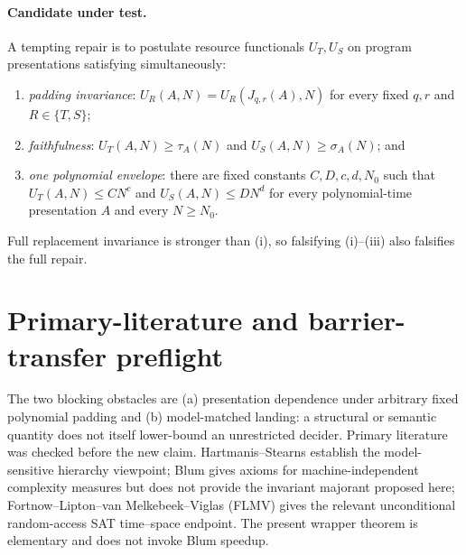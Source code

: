 \documentclass[11pt]{article}
\begin{document}
\paragraph{Candidate under test.}
A tempting repair is to postulate resource functionals $U_T,U_S$ on program
presentations satisfying simultaneously:
\begin{enumerate}[label=(\roman*),leftmargin=1.8em]
\item \emph{padding invariance}: $U_R(A,N)=U_R(J_{q,r}(A),N)$ for every fixed
      $q,r$ and $R\in\{T,S\}$;
\item \emph{faithfulness}: $U_T(A,N)\ge\tau_A(N)$ and
      $U_S(A,N)\ge\sigma_A(N)$; and
\item \emph{one polynomial envelope}: there are fixed constants
      $C,D,c,d,N_0$ such that $U_T(A,N)\le C N^c$ and
      $U_S(A,N)\le D N^d$ for every polynomial-time presentation $A$ and
      every $N\ge N_0$.
\end{enumerate}
Full replacement invariance is stronger than (i), so falsifying (i)--(iii)
also falsifies the full repair.

\section{Primary-literature and barrier-transfer preflight}

The two blocking obstacles are (a) presentation dependence under arbitrary
fixed polynomial padding and (b) model-matched landing: a structural or
semantic quantity does not itself lower-bound an unrestricted decider.
Primary literature was checked before the new claim.  Hartmanis--Stearns
establish the model-sensitive hierarchy viewpoint; Blum gives axioms for
machine-independent complexity measures but does not provide the invariant
majorant proposed here; Fortnow--Lipton--van Melkebeek--Viglas (FLMV) gives the
relevant unconditional random-access SAT time--space endpoint.  The present
wrapper theorem is elementary and does not invoke Blum speedup.
\end{document}
